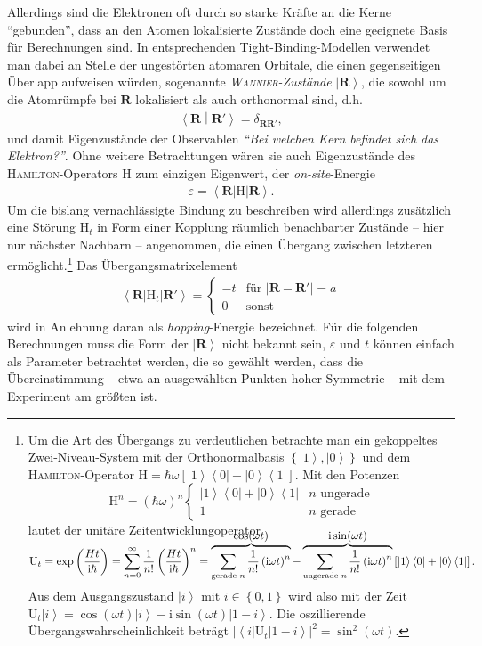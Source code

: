 \documentclass[a4paper, 10pt, twoside, openany]{book} %
\newcommand \bra[1]{\left \langle #1 \right |}
\newcommand \ket[1]{\left | #1 \right \rangle}
\newcommand \bracket[2]{\left \langle #1 \middle | #2 \right \rangle}
\newcommand \parens[1]{\left ( #1 \right )}
\newcommand \bracks[1]{\left [ #1 \right ]}
\newcommand \braces[1]{\left \lbrace #1 \right \rbrace}
\newcommand \abs[1]{\left | #1 \right |}
\def \I {\mathrm i}
\def \epsilon {\varepsilon}
\def \vec {\boldsymbol}
\newcommand \op[1]{\mathrm{#1}}
\begin{document}
Allerdings sind die Elektronen oft durch so starke Kräfte an die Kerne "`gebunden"', dass an den Atomen lokalisierte Zustände doch eine geeignete Basis für Berechnungen sind. In entsprechenden Tight-Binding-Modellen verwendet man dabei an Stelle der ungestörten atomaren Orbitale, die einen gegenseitigen Überlapp aufweisen würden, sogenannte \emph{\textsc{Wannier}-Zustände} $\ket{\vec R}$, die sowohl um die Atomrümpfe bei $\vec R$ lokalisiert als auch orthonormal sind, d.h.
%
\begin{align}
    \bracket{\vec R}{\vec R'} = \delta_{\vec R \vec R'},
    \label{orthogonale R}
\end{align}
%
und damit Eigenzustände der Observablen \emph{"`Bei welchen Kern befindet sich das Elektron?"'}. Ohne weitere Betrachtungen wären sie auch Eigenzustände des \textsc{Hamilton}-Operators $\op H$ zum einzigen Eigenwert, der \emph{on-site}-Energie
%
\begin{align*}
    \epsilon = \bra{\vec R} \op H \ket{\vec R}.
\end{align*}
%
Um die bislang vernachlässigte Bindung zu beschreiben wird allerdings zusätzlich eine Störung $\op H_t$ in Form einer Kopplung räumlich benachbarter Zustände -- hier nur nächster Nachbarn -- angenommen, die einen Übergang zwischen letzteren ermöglicht.\footnote{Um die Art des Übergangs zu verdeutlichen betrachte man ein gekoppeltes Zwei-Niveau-System mit der Orthonormalbasis $\braces{\ket 1, \ket 0}$ und dem \textsc{Hamilton}-Operator $\op H = \hbar \omega \bracks{\ket 1 \bra 0 + \ket 0 \bra 1}$. Mit den Potenzen $$\op H^n = (\hbar \omega)^n \begin{cases} \ket 1 \bra 0 + \ket 0 \bra 1 & \text{$n$ ungerade} \\ 1 & \text{$n$ gerade} \end{cases}$$ lautet der unitäre Zeitentwicklungoperator $$\op U_t = \exp \parens{\frac{H t}{\I \hbar}} = \sum_{n = 0}^\infty \frac 1 {n!} \parens{\frac{H t}{\I \hbar}}^n = \smash{\overbrace{\sum_\text{gerade $n$} \frac 1 {n!} \parens{\I \omega  t}^n}^{\displaystyle \cos(\omega t)} - \overbrace{\sum_\text{ungerade $n$} \frac{1}{n!} \parens{\I \omega t}^n}^{\displaystyle \I \sin(\omega t)}} \bracks{\ket 1 \bra 0 + \ket 0 \bra 1}.$$ Aus dem Ausgangszustand $\ket i$ mit $i \in \braces{0, 1}$ wird also mit der Zeit $\op U_t \ket i = \cos(\omega t) \ket i - \I \sin(\omega t) \ket{1 - i}$. Die oszillierende Übergangswahrscheinlichkeit beträgt $|\bra i \op U_t \ket{1 - i}|^2 = \sin^2(\omega t).$} Das Übergangsmatrixelement
%
\begin{align*}
    \bra{\vec R} \op H_t \ket{\vec R'} =
    \begin{cases}
        -t & \text{für } \abs{\vec R - \vec R'} = a \\
        0 & \text{sonst}
    \end{cases}
\end{align*}
%
wird in Anlehnung daran als \emph{hopping}-Energie bezeichnet. Für die folgenden Berechnungen muss die Form der $\ket{\vec R}$ nicht bekannt sein, $\epsilon$ und $t$ können einfach als Parameter betrachtet werden, die so gewählt werden, dass die Übereinstimmung -- etwa an ausgewählten Punkten hoher Symmetrie -- mit dem Experiment am größten ist.
\end{document}
